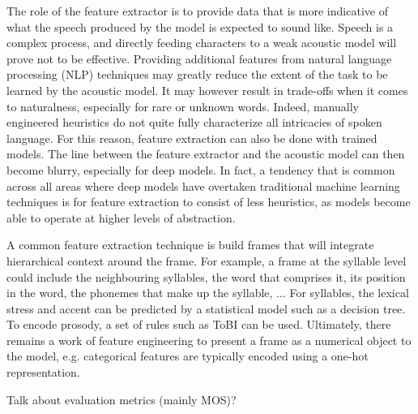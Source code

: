 \documentclass[a4paper, oneside, 12pt, english]{article}
\begin{document}
The role of the feature extractor is to provide data that is more indicative of what the speech produced by the model is expected to sound like. Speech is a complex process, and directly feeding characters to a weak acoustic model will prove not to be effective. Providing additional features from natural language processing (NLP) techniques may greatly reduce the extent of the task to be learned by the acoustic model. It may however result in trade-offs when it comes to naturalness, especially for rare or unknown words. Indeed, manually engineered heuristics do not quite fully characterize all intricacies of spoken language. For this reason, feature extraction can also be done with trained models. The line between the feature extractor and the acoustic model can then become blurry, especially for deep models. In fact, a tendency that is common across all areas where deep models have overtaken traditional machine learning techniques is for feature extraction to consist of less heuristics, as models become able to operate at higher levels of abstraction.

A common feature extraction technique is build frames that will integrate hierarchical context around the frame. For example, a frame at the syllable level could include the neighbouring syllables, the word that comprises it, its position in the word, the phonemes that make up the syllable, ... For syllables, the lexical stress and accent can be predicted by a statistical model such as a decision tree. To encode prosody, a set of rules such as ToBI \citep{TOBI} can be used. Ultimately, there remains a work of feature engineering to present a frame as a numerical object to the model, e.g. categorical features are typically encoded using a one-hot representation.

\color{red}Talk about evaluation metrics (mainly MOS)?\color{black}
\end{document}
